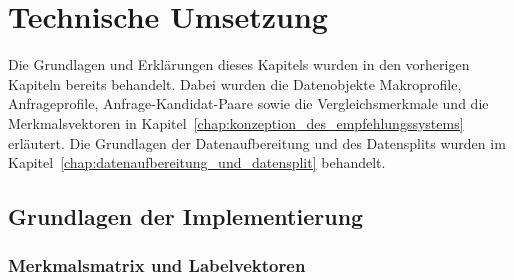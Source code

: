 \chapter{Technische Umsetzung}
\label{chap:technische_umsetzung}

Die Grundlagen und Erklärungen dieses Kapitels wurden in den vorherigen Kapiteln bereits behandelt. 
Dabei wurden die Datenobjekte Makroprofile, Anfrageprofile, Anfrage-Kandidat-Paare sowie die Vergleichsmerkmale und die Merkmalsvektoren in Kapitel~\ref{chap:konzeption_des_empfehlungssystems} erläutert.
Die Grundlagen der Datenaufbereitung und des Datensplits wurden im Kapitel~\ref{chap:datenaufbereitung_und_datensplit} behandelt.

\section{Grundlagen der Implementierung}
\label{sec:grundlagen_der_implementierung}

\subsection{Merkmalsmatrix und Labelvektoren}
\label{sec:merkmalsmatrix_und_labelvektoren}

